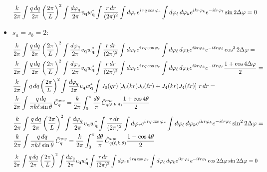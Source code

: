 \documentclass[a4paper,10pt]{article}
\begin{document}
\begin{itemize}
\begin{align}
         &\frac{k}{2\pi}\int \frac{q\,dq}{2\pi}\left(\frac{2\pi}{L}\right)^2\int\frac{d\varphi_q}{2\pi}v_{\bf q}w^*_{\bf q}\int\frac{r\,dr}{(2\pi)^2}\int d\varphi_re^{i\,rq\cos\varphi_r}\int d\varphi_\ell\,d\varphi_ke^{ikr\varphi_k}e^{-i\ell r\varphi_\ell}\sin2\Delta\varphi=0
       \end{align}
     \item $s_a=s_b=2$:
       \begin{align}\nonumber
         &\frac{k}{2\pi}\int \frac{q\,dq}{2\pi}\left(\frac{2\pi}{L}\right)^2\int\frac{d\varphi_q}{2\pi}v_{\bf q}w^*_{\bf q}\int\frac{r\,dr}{(2\pi)^2}\int d\varphi_re^{i\,rq\cos\varphi_r}\int d\varphi_\ell\,d\varphi_ke^{ikr\varphi_k}e^{-i\ell r\varphi_\ell}\cos^22\Delta\varphi=\\\nonumber
         &\frac{k}{2\pi}\int \frac{q\,dq}{2\pi}\left(\frac{2\pi}{L}\right)^2\int\frac{d\varphi_q}{2\pi}v_{\bf q}w^*_{\bf q}\int\frac{r\,dr}{(2\pi)^2}\int d\varphi_re^{i\,rq\cos\varphi_r}\int d\varphi_\ell\,d\varphi_ke^{ikr\varphi_k}e^{-i\ell r\varphi_\ell}\frac{1+\cos4\Delta\varphi}{2}=\\\nonumber
         &\frac{k}{2\pi}\int q\,dq\left(\frac{2\pi}{L}\right)^2\int\frac{d\varphi_q}{2\pi}v_{\bf q}w^*_{\bf q}\int J_0(qr)\left[J_0(kr)J_0(\ell r)+J_4(kr)J_4(\ell r)\right]\,r\,dr=\\
         &\frac{k}{2\pi}\int \frac{q\,dq}{\pi k\ell\sin\theta}\,\tilde{C}^{vw}_q=\frac{k}{2\pi}\int_0^\pi\frac{d\theta}{\pi}\,\tilde{C}^{vw}_{q(\ell,k,\theta)}\frac{1+\cos4\theta}{2} 
       \end{align}
       \begin{align}\nonumber
         &\frac{k}{2\pi}\int \frac{q\,dq}{2\pi}\left(\frac{2\pi}{L}\right)^2\int\frac{d\varphi_q}{2\pi}v_{\bf q}w^*_{\bf q}\int\frac{r\,dr}{(2\pi)^2}\int d\varphi_re^{i\,rq\cos\varphi_r}\int d\varphi_\ell\,d\varphi_ke^{ikr\varphi_k}e^{-i\ell r\varphi_\ell}\sin^22\Delta\varphi=\\
         &\frac{k}{2\pi}\int \frac{q\,dq}{\pi k\ell\sin\theta}\,\tilde{C}^{vw}_q=\frac{k}{2\pi}\int_0^\pi\frac{d\theta}{\pi}\,\tilde{C}^{vw}_{q(\ell,k,\theta)}\frac{1-\cos4\theta}{2} 
       \end{align}
       \begin{align}\nonumber
         &\frac{k}{2\pi}\int \frac{q\,dq}{2\pi}\left(\frac{2\pi}{L}\right)^2\int\frac{d\varphi_q}{2\pi}v_{\bf q}w^*_{\bf q}\int\frac{r\,dr}{(2\pi)^2}\int d\varphi_re^{i\,rq\cos\varphi_r}\int d\varphi_\ell\,d\varphi_ke^{ikr\varphi_k}e^{-i\ell r\varphi_\ell}\cos2\Delta\varphi\sin2\Delta\varphi=0
       \end{align}


    \end{itemize}
\end{document}
